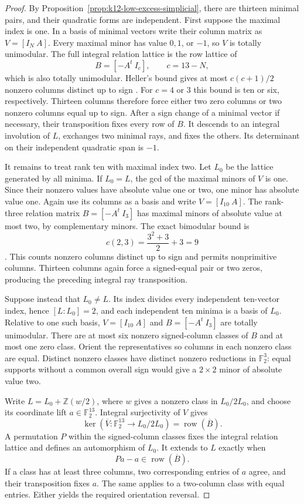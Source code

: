 \begin{proof}
By Proposition~\ref{prop:k12-low-excess-simplicial}, there are thirteen
minimal pairs, and their quadratic forms are independent. First suppose
the maximal index is one. In a basis of minimal vectors write their
column matrix as $V=[I_N\ A]$. Every maximal minor has value $0,1$,
or $-1$, so $V$ is totally unimodular. The full integral relation
lattice is the row lattice of
\[
 B=[-A^t\ I_c],\qquad c=13-N,
\]
which is also totally unimodular. Heller's bound gives at most
$c(c+1)/2$ nonzero columns distinct up to sign
\cite[Theorem~4.2, pp.~1358--1360]{Heller1957}.
For $c=4$ or $3$ this bound is ten or six, respectively.
Thirteen columns therefore force either two zero columns or two
nonzero columns equal up to sign. After a sign change of a minimal
vector if necessary, their transposition fixes every row of $B$.
It descends to an integral involution of $L$, exchanges two minimal
rays, and fixes the others. Its determinant on their independent
quadratic span is $-1$.

It remains to treat rank ten with maximal index two. Let $L_0$ be
the lattice generated by all minima. If $L_0=L$, the gcd of the
maximal minors of $V$ is one. Since their nonzero values have
absolute value one or two, one minor has absolute value one.
Again use its columns as a basis and write $V=[I_{10}\ A]$.
The rank-three relation matrix $B=[-A^t\ I_3]$ has maximal minors
of absolute value at most two, by complementary minors. The exact
bimodular bound is
\[
 c(2,3)=\frac{3^2+3}{2}+3=9
\]
\cite[Theorem~1, p.~4]{LeePaatStallknechtXu2022}.
This counts nonzero columns distinct up to sign and permits
nonprimitive columns. Thirteen columns again force a signed-equal
pair or two zeros, producing the preceding integral ray transposition.

Suppose instead that $L_0\ne L$. Its index divides every independent
ten-vector index, hence $[L:L_0]=2$, and each independent ten minima
is a basis of $L_0$. Relative to one such basis, $V=[I_{10}\ A]$
and $B=[-A^t\ I_3]$ are totally unimodular. There are at most six
nonzero signed-column classes of $B$ and at most one zero class.
Orient the representatives so columns in each nonzero class are equal.
Distinct nonzero classes have distinct nonzero reductions in
$\mathbb F_2^3$: equal supports without a common overall sign would
give a $2\times2$ minor of absolute value two.

Write $L=L_0+\mathbb Z(w/2)$, where $w$ gives a nonzero class in
$L_0/2L_0$, and choose its coordinate lift $a\in\mathbb F_2^{13}$.
Integral surjectivity of $V$ gives
\[
 \ker(\overline V:\mathbb F_2^{13}\longrightarrow L_0/2L_0)
 =\operatorname{row}(\overline B).
\]
A permutation $P$ within the signed-column classes fixes the integral
relation lattice and defines an automorphism of $L_0$. It extends to
$L$ exactly when
\[
 Pa-a\in\operatorname{row}(\overline B).
\]
If a class has at least three columns, two corresponding entries of
$a$ agree, and their transposition fixes $a$. The same applies to a
two-column class with equal entries. Either yields the required
orientation reversal.


\end{proof}
